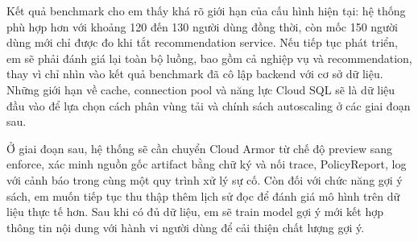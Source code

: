 Kết quả benchmark cho em thấy khá rõ giới hạn của cấu hình hiện tại: hệ thống phù hợp hơn với khoảng 120 đến 130 người dùng đồng thời, còn mốc 150 người dùng mới chỉ được đo khi tắt recommendation service. Nếu tiếp tục phát triển, em sẽ phải đánh giá lại toàn bộ luồng, bao gồm cả nghiệp vụ và recommendation, thay vì chỉ nhìn vào kết quả benchmark đã cô lập backend với cơ sở dữ liệu. Những giới hạn về cache, connection pool và năng lực Cloud SQL sẽ là dữ liệu đầu vào để lựa chọn cách phân vùng tải và chính sách autoscaling ở các giai đoạn sau.

Ở giai đoạn sau, hệ thống sẽ cần chuyển Cloud Armor từ chế độ preview sang enforce, xác minh nguồn gốc artifact bằng chữ ký và nối trace, PolicyReport, log với cảnh báo trong cùng một quy trình xử lý sự cố. Còn đối với chức năng gợi ý sách, em muốn tiếp tục thu thập thêm lịch sử đọc để đánh giá mô hình trên dữ liệu thực tế hơn. Sau khi có đủ dữ liệu, em sẽ train model gợi ý mới kết hợp thông tin nội dung với hành vi người dùng để cải thiện chất lượng gợi ý.
